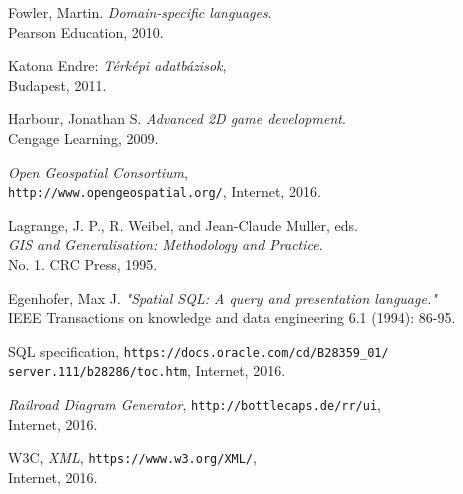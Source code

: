\begin{thebibliography}{9}



Fowler, Martin. \emph{Domain-specific languages}. \\
Pearson Education, 2010.

Katona Endre: \emph{Térképi adatbázisok},\\
Budapest, 2011.

Harbour, Jonathan S. \emph{Advanced 2D game development}. \\
Cengage Learning, 2009.

\emph{Open Geospatial Consortium}, \\
\texttt{http://www.opengeospatial.org/}, Internet, 2016.

Lagrange, J. P., R. Weibel, and Jean-Claude Muller, eds. \\
\emph{GIS and Generalisation: Methodology and Practice}. \\
No. 1. CRC Press, 1995.

Egenhofer, Max J. \emph{"Spatial SQL: A query and presentation language."} \\
IEEE Transactions on knowledge and data engineering 6.1 (1994): 86-95.

SQL specification, \texttt{https://docs.oracle.com/cd/B28359\_01/} \\
\texttt{server.111/b28286/toc.htm}, Internet, 2016.

\emph{Railroad Diagram Generator}, \texttt{http://bottlecaps.de/rr/ui}, \\
Internet, 2016.

W3C, \emph{XML}, \texttt{https://www.w3.org/XML/}, \\
Internet, 2016.


\end{thebibliography}
